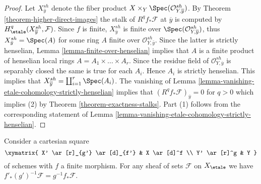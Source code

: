 \begin{proof}
Let $X_{\overline{y}}^{sh}$ denote the fiber product
$X \times_Y \Spec(\mathcal{O}_{Y, \overline{y}}^{sh})$.
By Theorem \ref{theorem-higher-direct-images}
the stalk of $R^qf_*\mathcal{F}$ at $\overline{y}$ is computed by
$H_\etale^q(X_{\overline{y}}^{sh}, \mathcal{F})$.
Since $f$ is finite, $X_{\bar y}^{sh}$ is finite over
$\Spec(\mathcal{O}_{Y, \overline{y}}^{sh})$, thus
$X_{\bar y}^{sh} = \Spec(A)$ for some ring $A$
finite over $\mathcal{O}_{Y, \bar y}^{sh}$.
Since the latter is strictly henselian,
Lemma \ref{lemma-finite-over-henselian}
implies that $A$ is a finite product of henselian local rings
$A = A_1 \times \ldots \times A_r$. Since the residue field of
$\mathcal{O}_{Y, \overline{y}}^{sh}$ is separably closed the
same is true for each $A_i$. Hence $A_i$ is strictly henselian.
This implies that $X_{\overline{y}}^{sh} = \coprod_{i = 1}^r \Spec(A_i)$.
The vanishing of
Lemma \ref{lemma-vanishing-etale-cohomology-strictly-henselian}
implies that $(R^qf_*\mathcal{F})_{\overline{y}} = 0$ for $q > 0$
which implies (2) by Theorem \ref{theorem-exactness-stalks}.
Part (1) follows from the corresponding statement of
Lemma \ref{lemma-vanishing-etale-cohomology-strictly-henselian}.
\end{proof}

\begin{lemma}
\label{lemma-finite-pushforward-commutes-with-base-change}
Consider a cartesian square
$$
\xymatrix{
X' \ar[r]_{g'} \ar[d]_{f'} & X \ar[d]^f \\
Y' \ar[r]^g & Y
}
$$
of schemes with $f$ a finite morphism.
For any sheaf of sets $\mathcal{F}$ on $X_\etale$ we have
$f'_*(g')^{-1}\mathcal{F} = g^{-1}f_*\mathcal{F}$.
\end{lemma}


